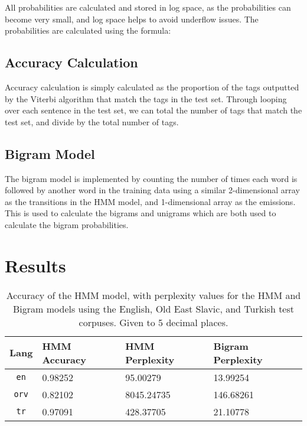 \documentclass[a4paper, 12pt]{article}
\begin{document}
All probabilities are calculated and stored in log space, as the probabilities can become very small, and log space helps to avoid underflow issues. The probabilities are calculated using the formula:


\subsection{Accuracy Calculation}

Accuracy calculation is simply calculated as the proportion of the tags outputted by the Viterbi algorithm that match the tags in the test set. Through looping over each sentence in the test set, we can total the number of tags that match the test set, and divide by the total number of tags.

\subsection{Bigram Model}

The bigram model is implemented by counting the number of times each word is followed by another word in the training data using a similar 2-dimensional array as the transitions in the HMM model, and 1-dimensional array as the emissions. This is used to calculate the bigrams and unigrams which are both used to calculate the bigram probabilities.

\pagebreak
\section{Results}

\begin{table}[H]
    \centering
    \begin{tabular}{c | l | l | l}
        \textbf{Lang}   & \textbf{HMM Accuracy} & \textbf{HMM Perplexity}   & \textbf{Bigram Perplexity}\\
        \hline
        \texttt{en}     & 0.98252               & 95.00279                  & 13.99254                  \\
        \hline
        \texttt{orv}    & 0.82102               & 8045.24735                & 146.68261                 \\
        \hline
        \texttt{tr}     & 0.97091               & 428.37705                 & 21.10778                  \\
    \end{tabular}
    \caption{Accuracy of the HMM model, with perplexity values for the HMM and Bigram models using the English, Old East Slavic, and Turkish test corpuses. Given to 5 decimal places.}
    \label{tab:hmm-accuracy}
\end{table}
\end{document}
